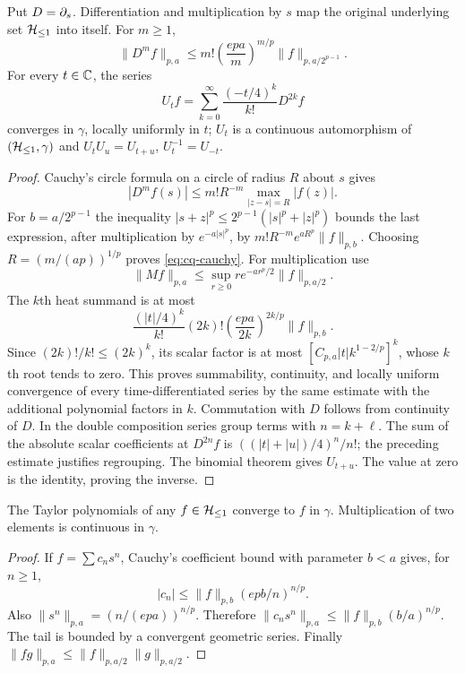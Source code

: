 \begin{cqlemma}\label{thm:cq-heat}
Put $D=\partial_s$. Differentiation and multiplication by $s$ map the
original underlying set $\mathcal H_{\leq 1}$ into itself. For $m\geq1$,
\begin{equation}\label{eq:cq-cauchy}
 \|D^mf\|_{p,a}\leq
 m!\left(\frac{epa}{m}\right)^{m/p}
 \|f\|_{p,a/2^{p-1}}.
\end{equation}
For every $t\in\mathbb C$, the series
\begin{equation}\label{eq:cq-U}
 U_tf=\sum_{k=0}^\infty\frac{(-t/4)^k}{k!}D^{2k}f
\end{equation}
converges in $\gamma$, locally uniformly in $t$; $U_t$ is a
continuous automorphism of $(\mathcal H_{\leq 1},\gamma)$ and
$U_tU_u=U_{t+u}$, $U_t^{-1}=U_{-t}$.
\end{cqlemma}
\begin{proof}
Cauchy's circle formula on a circle of radius $R$ about $s$ gives
\[
 |D^mf(s)|\leq m!R^{-m}\max_{|z-s|=R}|f(z)|.
\]
For $b=a/2^{p-1}$ the inequality
$|s+z|^p\leq2^{p-1}(|s|^p+|z|^p)$ bounds the last expression,
after multiplication by $e^{-a|s|^p}$, by
$m!R^{-m}e^{aR^p}\|f\|_{p,b}$. Choosing
$R=(m/(ap))^{1/p}$ proves \eqref{eq:cq-cauchy}.
For multiplication use
\[
 \|Mf\|_{p,a}\leq\sup_{r\geq0}re^{-ar^p/2}\|f\|_{p,a/2}.
\]
The $k$th heat summand is at most
\[
 \frac{(|t|/4)^k}{k!}(2k)!
       \left(\frac{epa}{2k}\right)^{2k/p}\|f\|_{p,b}.
\]
Since $(2k)!/k!\leq(2k)^k$, its scalar factor is at most
$[C_{p,a}|t|k^{1-2/p}]^k$, whose $k$th root tends to zero.
This proves summability, continuity, and locally uniform convergence
of every time-differentiated series by the same estimate with the
additional polynomial factors in $k$. Commutation with $D$ follows
from continuity of $D$. In the double composition series group
terms with $n=k+\ell$. The sum of the absolute scalar coefficients
at $D^{2n}f$ is $( (|t|+|u|)/4)^n/n!$; the preceding estimate
justifies regrouping. The binomial theorem gives $U_{t+u}$.
The value at zero is the identity, proving the inverse.
\end{proof}

\begin{cqlemma}\label{thm:cq-density}
The Taylor polynomials of any $f\in\mathcal H_{\leq 1}$ converge to $f$ in $\gamma$.
Multiplication of two elements is continuous in $\gamma$.
\end{cqlemma}
\begin{proof}
If $f=\sum c_ns^n$, Cauchy's coefficient bound with parameter
$b<a$ gives, for $n\geq1$,
\[
 |c_n|\leq\|f\|_{p,b}(epb/n)^{n/p}.
\]
Also $\|s^n\|_{p,a}=(n/(epa))^{n/p}$. Therefore
$\|c_ns^n\|_{p,a}\leq\|f\|_{p,b}(b/a)^{n/p}$.
The tail is bounded by a convergent geometric series.
Finally $\|fg\|_{p,a}\leq\|f\|_{p,a/2}\|g\|_{p,a/2}$.
\end{proof}

